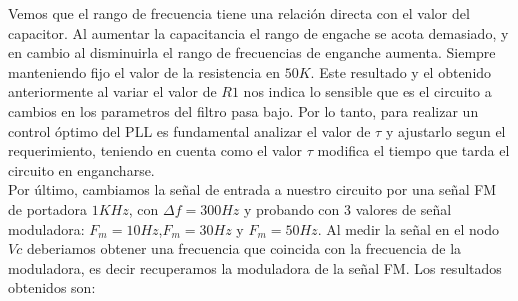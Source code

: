 \documentclass[10pt,a4paper]{IEEEtran}
\begin{document}
Vemos que el rango de frecuencia tiene una relación directa con el valor del capacitor.  Al aumentar la capacitancia el rango de 
engache se acota demasiado, y en cambio al disminuirla el rango de frecuencias de enganche aumenta. Siempre manteniendo fijo el 
valor de la resistencia en $50K$. Este resultado y el obtenido anteriormente al variar el valor de $R1$ nos indica lo sensible que es el circuito 
a cambios en los parametros del filtro pasa bajo. Por lo tanto, para realizar un control óptimo del PLL es fundamental analizar el valor de $\tau$ y 
ajustarlo segun el requerimiento, teniendo en cuenta como el valor $\tau$ modifica el tiempo que tarda el circuito en engancharse.\\

Por último, cambiamos la señal de entrada a nuestro circuito por una señal FM de portadora $1KHz$, con $\Delta f=300Hz$ y probando con 3 valores de señal 
moduladora: $F_m=10Hz$,$F_m=30Hz$ y $F_m=50Hz$. Al medir la señal en el nodo $Vc$ deberiamos obtener una frecuencia que coincida con la frecuencia de la moduladora, es decir 
recuperamos la moduladora de la señal FM. Los resultados obtenidos son:
\end{document}
